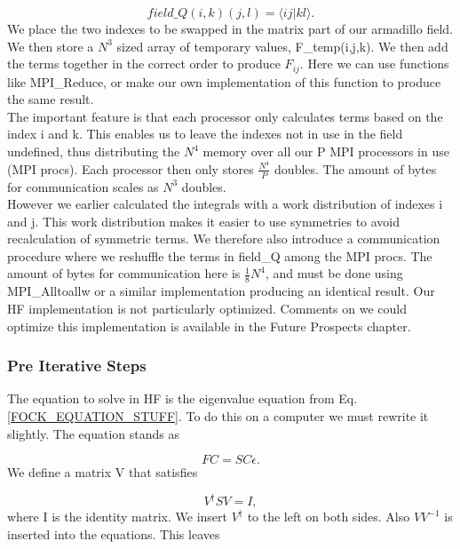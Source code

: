 \begin{equation}
field\_Q(i,k)(j,l) = \langle i j | k l \rangle .
\end{equation}
We place the two indexes to be swapped in the matrix part of our armadillo field. We then store a $N^3$ sized array of temporary values, F\_temp(i,j,k). We then add the terms together in the correct order to produce $F_{ij}$. Here we can use functions like MPI\_Reduce, or make our own implementation of this function to produce the same result. \\

The important feature is that each processor only calculates terms based on the index i and k. This enables us to leave the indexes not in use in the field undefined, thus distributing the $N^4$ memory over all our P MPI processors in use (MPI procs). Each processor then only stores $\frac{N^4}{P}$ doubles. The amount of bytes for communication scales as $N^3$ doubles. \\

However we earlier calculated the integrals with a work distribution of indexes i and j. This work distribution makes it easier to use symmetries to avoid recalculation of symmetric terms. We therefore also introduce a communication procedure where we reshuffle the terms in field\_Q among the MPI procs. The amount of bytes for communication here is $\frac{1}{8} N^4$, and must be done using MPI\_Alltoallw or a similar implementation producing an identical result. Our HF implementation is not particularly optimized. Comments on we could optimize this implementation is available in the Future Prospects chapter. 

\subsubsection{Pre Iterative Steps}
The equation to solve in HF is the eigenvalue equation from Eq. \eqref{FOCK_EQUATION_STUFF}. To do this on a computer we must rewrite it slightly. The equation stands as

\begin{equation}
F C = S C \epsilon . \label{fdsaghbxcxd}
\end{equation}
We define a matrix V that satisfies

\begin{equation}
V^{\dag} S V = I , \label{fdsafafdsafdsafa}
\end{equation}
where I is the identity matrix. We insert $V^{\dag}$ to the left on both sides. Also $V V^{-1} $ is inserted into the equations. This leaves

